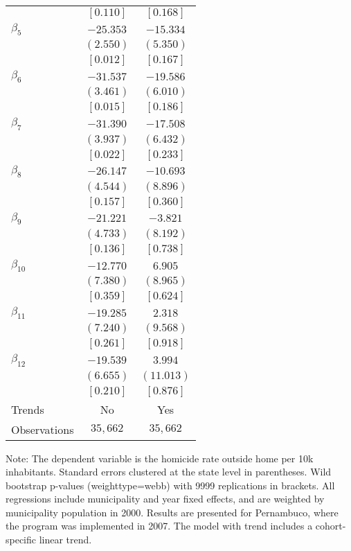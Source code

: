 \documentclass[12pt]{article}
\begin{document}
\begin{table}[H]
\begin{tabular}{lcc}
& $[  0.110]$ & $[  0.168]$ \\
$\beta_{5}$ & $-25.353$ & $-15.334$ \\
& $(  2.550)$ & $(  5.350)$ \\
& $[  0.012]$ & $[  0.167]$ \\
$\beta_{6}$ & $-31.537$ & $-19.586$ \\
& $(  3.461)$ & $(  6.010)$ \\
& $[  0.015]$ & $[  0.186]$ \\
$\beta_{7}$ & $-31.390$ & $-17.508$ \\
& $(  3.937)$ & $(  6.432)$ \\
& $[  0.022]$ & $[  0.233]$ \\
$\beta_{8}$ & $-26.147$ & $-10.693$ \\
& $(  4.544)$ & $(  8.896)$ \\
& $[  0.157]$ & $[  0.360]$ \\
$\beta_{9}$ & $-21.221$ & $ -3.821$ \\
& $(  4.733)$ & $(  8.192)$ \\
& $[  0.136]$ & $[  0.738]$ \\
$\beta_{10}$ & $-12.770$ & $  6.905$ \\
& $(  7.380)$ & $(  8.965)$ \\
& $[  0.359]$ & $[  0.624]$ \\
$\beta_{11}$ & $-19.285$ & $  2.318$ \\
& $(  7.240)$ & $(  9.568)$ \\
& $[  0.261]$ & $[  0.918]$ \\
$\beta_{12}$ & $-19.539$ & $  3.994$ \\
& $(  6.655)$ & $( 11.013)$ \\
& $[  0.210]$ & $[  0.876]$ \\
\midrule
Trends & No & Yes \\
Observations & $   35,662$ & $   35,662$ \\
\bottomrule
\end{tabular}
\begin{threeparttable}
\begin{tablenotes}
\small
\item Note: The dependent variable is the homicide rate outside home per 10k inhabitants. 
Standard errors clustered at the state level in parentheses. 
Wild bootstrap p-values (weighttype=webb) with 9999 replications in brackets. 
All regressions include municipality and year fixed effects, and are weighted by municipality population in 2000. 
Results are presented for Pernambuco, where the program was implemented in 2007. 
The model with trend includes a cohort-specific linear trend. 
\end{tablenotes}
\end{threeparttable}
\end{table}
\end{document}
